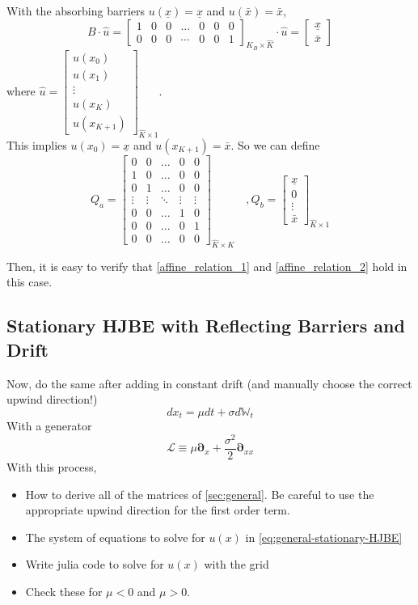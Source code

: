 \documentclass[11pt]{article}
\newcommand{\D}[1][]{\ensuremath{\boldsymbol{\partial}_{#1}}}
\newcommand{\W}{\ensuremath{\mathbb{W}}}
\begin{document}
With the absorbing barriers $u(\underline{x}) = \underline{x}$ and $u(\bar{x}) = \bar{x}$,  
\begin{equation}
B\cdot\hat{u} =\begin{bmatrix}
1&0&0&\dots&0&0&0\\
0&0&0&\cdots&0&0&1
\end{bmatrix}_{K_B\times \hat{K}}\cdot\hat{u} = \begin{bmatrix}
\underline{\textit{\~{x}}}\\
\bar{\textit{\~{x}}}
\end{bmatrix}
\end{equation}
where $\hat{u} = \begin{bmatrix}
u(x_0)\\
u(x_1)\\
\vdots\\
u(x_K)\\
u(x_{K+1})
\end{bmatrix}_{\hat{K}\times 1}$.\\
This implies $u(x_0) = \underline{\textit{\~{x}}}$ and $u(x_{K+1}) = \bar{\textit{\~{x}}}$. So we can define 
\begin{equation}
Q_a = \begin{bmatrix}
0& 0&\dots&0&0\\
1&0&\dots&0&0\\
0&1&\dots&0&0\\
\vdots&\vdots&\ddots&\vdots&\vdots\\
0&0&\dots&1&0\\
0&0&\dots&0&1\\
0&0&\dots&0&0
\end{bmatrix}_{\hat{K}\times K}\quad , Q_b = \begin{bmatrix}
\underline{\textit{\~{x}}}\\
0\\
\vdots\\
\bar{\textit{\~{x}}}
\end{bmatrix}_{\hat{K}\times 1}
\end{equation}

Then, it is easy to verify that \eqref{affine_relation_1} and \eqref{affine_relation_2} hold in this case.


\subsection{Stationary HJBE with Reflecting Barriers and Drift}
Now, do the same after adding in constant drift (and manually choose the correct upwind direction!)
$$
d x_t = \mu dt + \sigma d\W_t
$$
With a generator
$$
	\mathcal{L} \equiv \mu \D[x] + \frac{\sigma^2}{2}\D[xx]
$$
With this process,
\begin{itemize}
	\item How to derive all of the matrices of \cref{sec:general}.  Be careful to use the appropriate upwind direction for the first order term.
	\item The system of equations to solve for $u(x)$ in \cref{eq:general-stationary-HJBE}
	\item Write julia code to solve for $u(x)$ with the grid
	\item Check these for $\mu < 0$ and $\mu > 0$.
\end{itemize}
\end{document}
